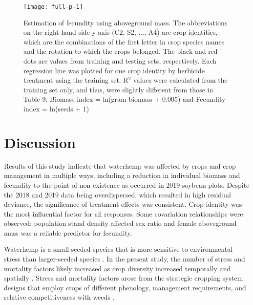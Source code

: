 \documentclass[utf8]{frontiersSCNS}
\begin{document}
\begin{figure}[htbp]
\texttt{[image: full-p-1]} \caption{Estimation of fecundity using aboveground mass. The abbreviations on the right-hand-side y-axis (C2, S2, ..., A4) are crop identities, which are the combinations of the first letter in crop species names and the rotation to which the crops belonged. The black and red dots are values from training and testing sets, respectively. Each regression line was plotted for one crop identity by herbicide treatment using the training set. R$^2$ values were calculated from the training set only, and thus, were slightly different from those in Table 9. Biomass index = ln(gram biomass + 0.005) and Fecundity index = ln(seeds + 1)}\label{fig:full-p}
\end{figure}

\hypertarget{discussion}{%
\section*{Discussion}\label{discussion}}

Results of this study indicate that waterhemp was affected by crops and crop management in multiple ways, including a reduction in individual biomass and fecundity to the point of non-existence as occurred in 2019 soybean plots.
Despite the 2018 and 2019 data being overdispersed, which resulted in high residual deviance, the significance of treatment effects was consistent. Crop identity was the most influential factor for all responses. Some covariation relationships were observed: population stand density affected sex ratio and female aboveground mass was a reliable predictor for fecundity.

Waterhemp is a small-seeded species that is more sensitive to environmental stress than larger-seeded species \citep{harburLightGrowthRate2004}. In the present study, the number of stress and mortality factors likely increased as crop diversity increased temporally and spatially \citep{martinEffectCropRotation1993}. Stress and mortality factors arose from the strategic cropping system designs that employ crops of different phenology, management requirements, and relative competitiveness with weeds \citep{liebmanSustainableWeedManagement1990, liebmanCropRotationIntercropping1993}.
\end{document}
